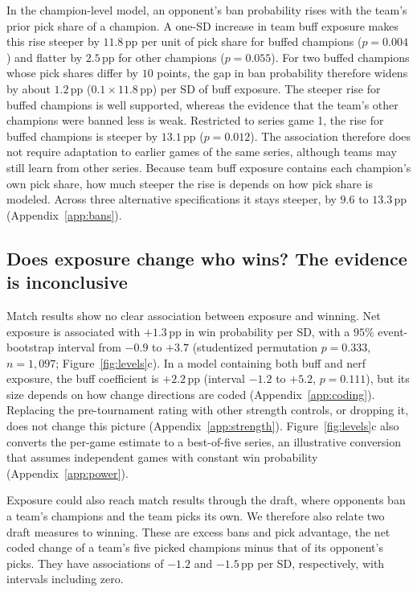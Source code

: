 \documentclass[11pt]{article}
\newcommand{\pp}{\,pp}
\begin{document}
In the champion-level model, an opponent's ban probability rises with the team's prior pick share of a champion. A one-SD increase in team buff exposure makes this rise steeper by $11.8$\pp{} per unit of pick share for buffed champions ($p = 0.004$) and flatter by $2.5$\pp{} for other champions ($p = 0.055$). For two buffed champions whose pick shares differ by $10$ points, the gap in ban probability therefore widens by about $1.2$\pp{} ($0.1 \times 11.8$\pp{}) per SD of buff exposure. The steeper rise for buffed champions is well supported, whereas the evidence that the team's other champions were banned less is weak. Restricted to series game 1, the rise for buffed champions is steeper by $13.1$\pp{} ($p = 0.012$). The association therefore does not require adaptation to earlier games of the same series, although teams may still learn from other series. Because team buff exposure contains each champion's own pick share, how much steeper the rise is depends on how pick share is modeled. Across three alternative specifications it stays steeper, by $9.6$ to $13.3$\pp{} (Appendix~\ref{app:bans}).

\subsection{Does exposure change who wins? The evidence is inconclusive}
\label{sec:results}
Match results show no clear association between exposure and winning. Net exposure is associated with $+1.3$\pp{} in win probability per SD, with a $95\%$ event-bootstrap interval from $-0.9$ to $+3.7$ (studentized permutation $p = 0.333$, $n = 1{,}097$; Figure~\ref{fig:levels}c). In a model containing both buff and nerf exposure, the buff coefficient is $+2.2$\pp{} (interval $-1.2$ to $+5.2$, $p = 0.111$), but its size depends on how change directions are coded (Appendix~\ref{app:coding}). Replacing the pre-tournament rating with other strength controls, or dropping it, does not change this picture (Appendix~\ref{app:strength}). Figure~\ref{fig:levels}c also converts the per-game estimate to a best-of-five series, an illustrative conversion that assumes independent games with constant win probability (Appendix~\ref{app:power}).

Exposure could also reach match results through the draft, where opponents ban a team's champions and the team picks its own. We therefore also relate two draft measures to winning. These are excess bans and pick advantage, the net coded change of a team's five picked champions minus that of its opponent's picks. They have associations of $-1.2$ and $-1.5$\pp{} per SD, respectively, with intervals including zero.
\end{document}
